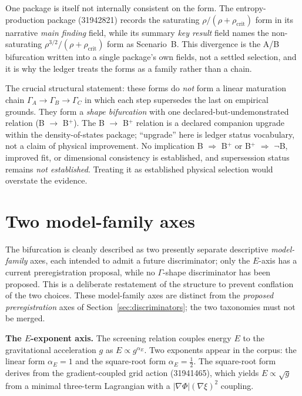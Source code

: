 \documentclass[11pt,a4paper]{article}
\begin{document}
One package is itself not internally consistent on the form. The entropy-production package (31942821) records the saturating $\rho/(\rho+\rho_{\mathrm{crit}})$ form in its narrative \emph{main finding} field, while its summary \emph{key result} field names the non-saturating $\rho^{3/2}/(\rho+\rho_{\mathrm{crit}})$ form as Scenario~B. This divergence is the A/B bifurcation written into a single package's own fields, not a settled selection, and it is why the ledger treats the forms as a family rather than a chain.

The crucial structural statement: these forms do \emph{not} form a linear maturation chain $\Gamma_{A} \to \Gamma_{B} \to \Gamma_{C}$ in which each step supersedes the last on empirical grounds. They form a \emph{shape bifurcation} with one declared-but-undemonstrated relation (B $\to$ B$^{+}$). The B $\to$ B$^{+}$ relation is a declared companion upgrade within the density-of-states package; ``upgrade'' here is ledger status vocabulary, not a claim of physical improvement. No implication B $\Rightarrow$ B$^{+}$ or B$^{+}$ $\Rightarrow$ $\neg$B, improved fit, or dimensional consistency is established, and supersession status remains \emph{not established}. Treating it as established physical selection would overstate the evidence.

\section{Two model-family axes}
\label{sec:axes}

The bifurcation is cleanly described as two presently separate descriptive \emph{model-family} axes, each intended to admit a future discriminator; only the $E$-axis has a current preregistration proposal, while no $\Gamma$-shape discriminator has been proposed. This is a deliberate restatement of the structure to prevent conflation of the two choices. These model-family axes are distinct from the \emph{proposed preregistration} axes of Section~\ref{sec:discriminators}; the two taxonomies must not be merged.

\textbf{The $E$-exponent axis.} The screening relation couples energy $E$ to the gravitational acceleration $g$ as $E \propto g^{\alpha_{E}}$. Two exponents appear in the corpus: the linear form $\alpha_{E} = 1$ and the square-root form $\alpha_{E} = \tfrac{1}{2}$. The square-root form derives from the gradient-coupled grid action (31941465), which yields $E \propto \sqrt{g}$ from a minimal three-term Lagrangian with a $|\nabla\Phi|(\nabla\xi)^{2}$ coupling.
\end{document}
